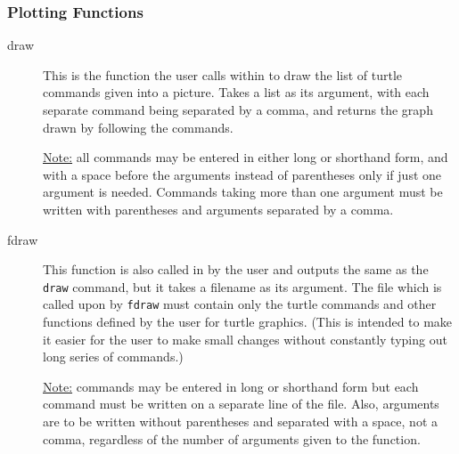 \subsubsection{Plotting Functions}
\begin{description}
 \item[draw] This is the function the user calls within {\REDUCE} to
       draw the list of turtle commands given into a picture. Takes a list
       as its argument, with each separate command being separated by a
       comma, and returns the graph drawn by following the commands.

       \underline{Note:} all commands may be entered in either long or
                         shorthand form, and with a space
                         before the arguments instead of parentheses only
                         if just one argument is needed. Commands taking
                         more than one argument must be written with
                         parentheses and arguments separated by a comma.
 \item[fdraw] This function is also called in {\REDUCE} by the user
       and outputs the same as the \texttt{draw} command, but it takes a
       filename as its argument. The file which is called upon by \texttt{fdraw}
       must contain only the turtle commands and other functions
       defined by the user for turtle graphics. (This is intended to make
       it easier for the user to make small changes without constantly
       typing out long series of commands.)

       \underline{Note:} commands may be entered in long or shorthand form
                         but each command must be written on a separate
                         line of the file. Also, arguments are to be
                         written without parentheses and separated with a
                         space, not a comma, regardless of the number of
                         arguments given to the function.
\end{description}


